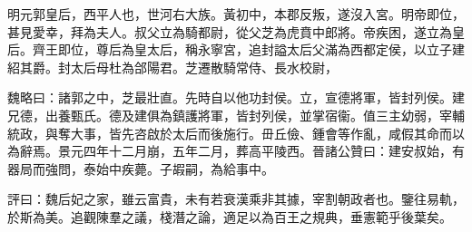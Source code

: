 
\begin{pinyinscope}
明元郭皇后，西平人也，世河右大族。黃初中，本郡反叛，遂沒入宮。明帝即位，甚見愛幸，拜為夫人。叔父立為騎都尉，從父芝為虎賁中郎將。帝疾困，遂立為皇后。齊王即位，尊后為皇太后，稱永寧宮，追封謚太后父滿為西都定侯，以立子建紹其爵。封太后母杜為郃陽君。芝遷散騎常侍、長水校尉，

魏略曰：諸郭之中，芝最壯直。先時自以他功封侯。立，宣德將軍，皆封列侯。建兄德，出養甄氏。德及建俱為鎮護將軍，皆封列侯，並掌宿衞。值三主幼弱，宰輔統政，與奪大事，皆先咨啟於太后而後施行。毌丘儉、鍾會等作亂，咸假其命而以為辭焉。景元四年十二月崩，五年二月，葬高平陵西。晉諸公贊曰：建安叔始，有器局而強問，泰始中疾薨。子嘏嗣，為給事中。

評曰：魏后妃之家，雖云富貴，未有若衰漢乘非其據，宰割朝政者也。鑒往易軌，於斯為美。追觀陳羣之議，棧潛之論，適足以為百王之規典，垂憲範乎後葉矣。


\end{pinyinscope}